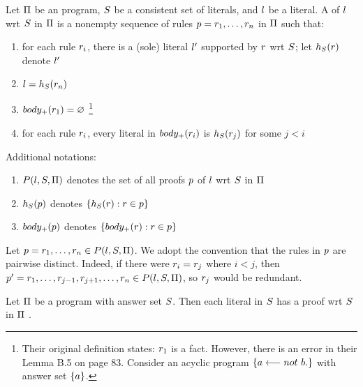 \documentclass{paper}
\begin{document}
\begin{flushleft}
\begin{definition}
Let $\Pi$ be an \ap{} program,
$S$ be a consistent set of literals,
and $l$ be a literal.
A  of $l$ wrt $S$ in $\Pi$ is
a nonempty sequence of rules
$p = {r}_{1}, \ldots, {r}_{n}$ in $\Pi$ such that:
\begin{enumerate}
\item
for each rule ${r}_{i}$, there is a (sole) literal
${l}'$ supported by $r$ wrt $S$;
let $h_S(r)$ denote ${l}'$
\item
$l = h_S({r}_{n})$
\item
$body_+({r}_{1}) = \varnothing$
\footnote
{Their original definition states: ${r}_{1}$ is a fact.
However, there is an error in their Lemma B.5 on page 83.
Consider an acyclic \ap{} program $\{a \longleftarrow not\ {b}.\}$
with answer set $\{a\}$.}
\item
for each rule ${r}_{i}$,
every literal in $body_+({r}_{i})$ is $h_S({r}_{j})$
for some $j < i$
\end{enumerate}
\cite[page 57]{hcfb}

\end{definition}

\begin{definition}

Additional notations:
\begin{enumerate}
\item
$P({l}, {S}, {\Pi})$ denotes the set of all proofs $p$
of $l$ wrt $S$ in $\Pi$
\item
$h_S(p)$ denotes $\{h_S(r) : r \in p\}$
\item
$body_+(p)$ denotes $\{body_+(r) : r \in p\}$
\end{enumerate}

\end{definition}

\begin{remark}

Let $p = {r}_{1}, \ldots, {r}_{n} \in P({l}, {S}, {\Pi})$.
We adopt the convention that the rules in $p$ are
pairwise distinct.
Indeed, if there were ${r}_{i} = {r}_{j}$ where
$i < j$, then ${p}' =
{r}_{1}, \ldots, {r}_{j - 1}, {r}_{j + 1}, \ldots, {r}_{n} \in P({l}, {S}, {\Pi})$,
so ${r}_{j}$ would be redundant.

\end{remark}

\begin{remark}

Let $\Pi$ be a \hcf{} \ap{} program with answer set $S$.
Then each literal in $S$ has a proof wrt $S$ in
$\Pi$ \cite[page 57]{hcfb}.


\end{remark}
\end{flushleft}
\end{document}
